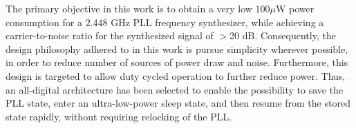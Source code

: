 
The primary objective in this work is to obtain a very low $100\mu$W power consumption for a 2.448 GHz PLL frequency synthesizer, while achieving a carrier-to-noise ratio for the synthesized signal of $>$20 dB. Consequently, the design philosophy adhered to in this work is pursue simplicity wherever possible, in order to reduce number of sources of power draw and noise. Furthermore, this design is targeted to allow duty cycled operation to further reduce power. Thus, an all-digital architecture has been selected to enable the possibility to save the PLL state, enter an ultra-low-power sleep state, and then resume from the stored state rapidly, without requiring relocking of the PLL. 

